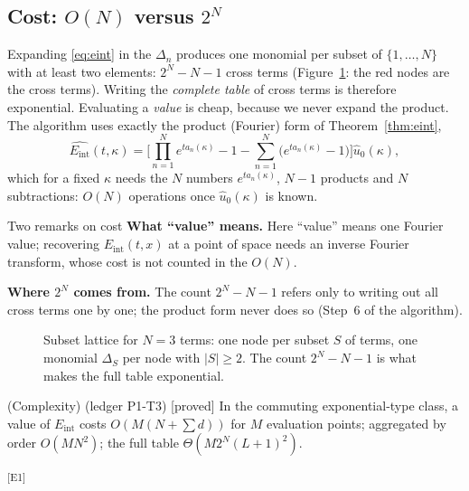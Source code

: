 \documentclass[11pt,a4paper]{article}
\theoremstyle{definition}
\newcommand{\badge}[2]{\textcolor{#1}{\textsf{\footnotesize[#2]}}}
\newcommand{\proved}[1][]{\badge{cC}{proved#1}}
\newcommand{\led}[1]{\textcolor{cG}{\textsf{\footnotesize(ledger #1)}}}
\newcommand{\edmark}[1]{\textsuperscript{\textcolor{cB}{\textsf{[#1]}}}}
\newcommand{\Eint}{E_{\mathrm{int}}}
\begin{document}
\subsection{Cost: $O(N)$ versus $2^N$}
Expanding \eqref{eq:eint} in the $\Delta_n$ produces one monomial per subset of $\{1,\dots,N\}$ with at least two elements: $2^N-N-1$ cross terms (Figure~\ref{fig:lattice}: the red nodes are the cross terms). Writing the \emph{complete table} of cross terms is therefore exponential. Evaluating a \emph{value} is cheap, because we never expand the product. The algorithm uses exactly the product (Fourier) form of Theorem~\ref{thm:eint},
\[
\widehat{\Eint}(t,\kappa)=\Big[\prod_{n=1}^Ne^{ta_n(\kappa)}-1-\sum_{n=1}^N\big(e^{ta_n(\kappa)}-1\big)\Big]\hat u_0(\kappa),
\]
which for a fixed $\kappa$ needs the $N$ numbers $e^{ta_n(\kappa)}$, $N-1$ products and $N$ subtractions: $O(N)$ operations once $\hat u_0(\kappa)$ is known.
\begin{aside}{Two remarks on cost}
\textbf{What ``value'' means.} Here ``value'' means one Fourier value; recovering $\Eint(t,x)$ at a point of space needs an inverse Fourier transform, whose cost is not counted in the $O(N)$.

\textbf{Where $2^N$ comes from.} The count $2^N-N-1$ refers only to writing out all cross terms one by one; the product form never does so (Step~6 of the algorithm).
\end{aside}
\begin{figure}[!htb]
\centering
{}
\caption{Subset lattice for $N=3$ terms: one node per subset $S$ of terms, one monomial $\Delta_S$ per node with $|S|\ge2$. The count $2^N-N-1$ is what makes the full table exponential.}\label{fig:lattice}
\end{figure}
\begin{proposition}{(Complexity) \led{P1-T3} \proved[]}
In the commuting exponential-type class, a value of $\Eint$ costs $O(M(N+\sum d))$ for $M$ evaluation points; aggregated by order $O(MN^2)$; the full table $\Theta(M2^N(L+1)^2)$.
\end{proposition}
\edmark{E1}
\end{document}
